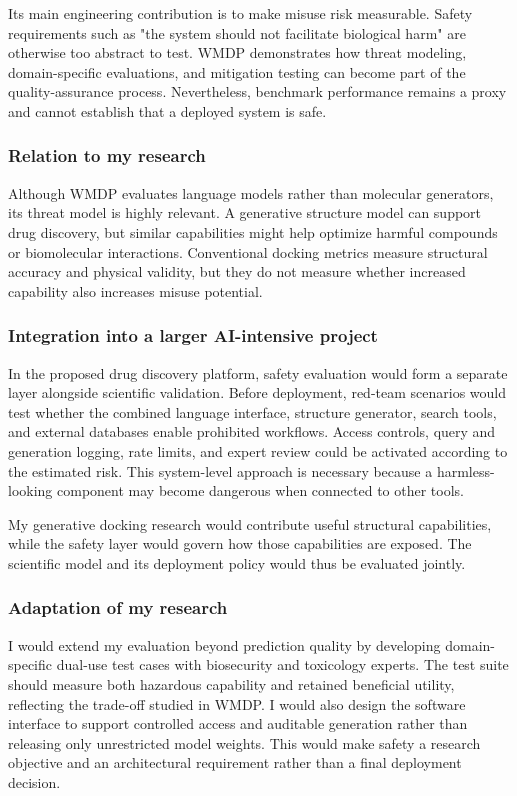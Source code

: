 \documentclass[a4paper,11pt]{article}
\begin{document}
Its main engineering contribution is to make misuse risk measurable. Safety requirements such as "the system should not facilitate biological harm" are otherwise too abstract to test. WMDP demonstrates how threat modeling, domain-specific evaluations, and mitigation testing can become part of the quality-assurance process. Nevertheless, benchmark performance remains a proxy and cannot establish that a deployed system is safe.

\subsubsection{Relation to my research}

Although WMDP evaluates language models rather than molecular generators, its threat model is highly relevant. A generative structure model can support drug discovery, but similar capabilities might help optimize harmful compounds or biomolecular interactions. Conventional docking metrics measure structural accuracy and physical validity, but they do not measure whether increased capability also increases misuse potential.

\subsubsection{Integration into a larger AI-intensive project}

In the proposed drug discovery platform, safety evaluation would form a separate layer alongside scientific validation. Before deployment, red-team scenarios would test whether the combined language interface, structure generator, search tools, and external databases enable prohibited workflows. Access controls, query and generation logging, rate limits, and expert review could be activated according to the estimated risk. This system-level approach is necessary because a harmless-looking component may become dangerous when connected to other tools.

My generative docking research would contribute useful structural capabilities, while the safety layer would govern how those capabilities are exposed. The scientific model and its deployment policy would thus be evaluated jointly.

\subsubsection{Adaptation of my research}

I would extend my evaluation beyond prediction quality by developing
domain-specific dual-use test cases with biosecurity and toxicology experts.
The test suite should measure both hazardous capability and retained beneficial
utility, reflecting the trade-off studied in WMDP. I would also design the
software interface to support controlled access and auditable generation rather
than releasing only unrestricted model weights. This would make safety a
research objective and an architectural requirement rather than a final
deployment decision.
\end{document}
